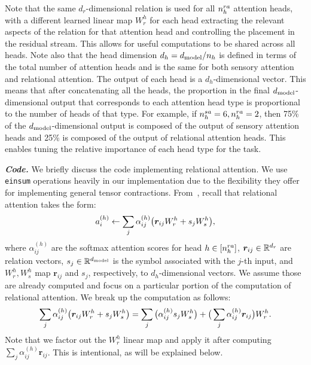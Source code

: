Note that the same $d_r$-dimensional relation is used for all $n_h^{ra}$ attention heads, with a different learned linear map $W_r^h$ for each head extracting the relevant aspects of the relation for that attention head and controlling the placement in the residual stream. This allows for useful computations to be shared across all heads. Note also that the head dimension $d_h = d_{\mathrm{model}} / n_h$ is defined in terms of the total number of attention heads and is the same for both sensory attention and relational attention. The output of each head is a $d_h$-dimensional vector. This means that after concatenating all the heads, the proportion in the final $d_{\mathrm{model}}$-dimensional output that corresponds to each attention head type is proportional to the number of heads of that type. For example, if $n_h^{sa} = 6, n_h^{ra} = 2$, then 75\% of the $d_{\mathrm{model}}$-dimensional output is composed of the output of sensory attention heads and 25\% is composed of the output of relational attention heads. This enables tuning the relative importance of each head type for the task.

\textit{\textbf{Code.}} We briefly discuss the code implementing relational attention. We use \texttt{einsum} operations heavily in our implementation due to the flexibility they offer for implementing general tensor contractions. From~, recall that relational attention takes the form:
\begin{equation}
    a_i^{(h)} \gets \sum_{j} \alpha_{ij}^{(h)} \big(\bm{r}_{ij} W_r^h + s_j W_s^h\big),
\end{equation}
where $\alpha_{ij}^{(h)}$ are the softmax attention scores for head $h \in [n_h^{ra}]$, $\bm{r}_{ij} \in \mathbb{R}^{d_r}$ are relation vectors, $s_j \in \mathbb{R}^{d_{\mathrm{model}}}$ is the symbol associated with the $j$-th input, and $W_r^h, W_s^h$ map $\bm{r}_{ij}$ and $s_j$, respectively, to $d_h$-dimensional vectors. We assume those are already computed and focus on a particular portion of the computation of relational attention. We break up the computation as follows:
\begin{equation}
    \sum_{j} \alpha_{ij}^{(h)} \big(\bm{r}_{ij} W_r^h + s_j W_s^h\big) = \sum_{j} \big(\alpha_{ij}^{(h)} s_j W_s^h\big) + \big(\sum_{j} \alpha_{ij}^{(h)} \bm{r}_{ij}\big) W_r^h.
\end{equation}
Note that we factor out the $W_r^h$ linear map and apply it after computing $\sum_{j} \alpha_{ij}^{(h)} \bm{r}_{ij}$. This is intentional, as will be explained below.

